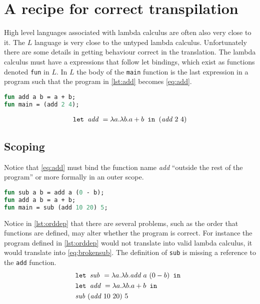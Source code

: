 \section{A recipe for correct transpilation}
High level languages associated with lambda calculus are often also very close to it.
The $L$ language is very close to the untyped lambda calculus.
Unfortunately there are some details in getting behaviour correct in the translation.
The lambda calculus must have a expressions that follow let bindings, which exist as functions denoted \texttt{fun} in $L$.
In $L$ the body of the \texttt{main} function is the last expression in a program such that the program in \autoref{lst:add} becomes \autoref{eq:add}.
\begin{lstlisting}[language=ML,caption={Add function in L},label={lst:add}]
fun add a b = a + b;
fun main = (add 2 4);
\end{lstlisting}
\begin{align}
  \texttt{let } \textit{add } = \lambda a.\lambda b.a + b \texttt{ in } (\textit{add } 2 \,\, 4)\label{eq:add}
\end{align}

\subsection{Scoping}\label{scoping}
Notice that \autoref{eq:add} must bind the function name \textit{add} ``outside the rest of the program'' or more formally in an outer scope.
\begin{lstlisting}[language=ML,caption={An order dependent program},label={lst:orddep}]
fun sub a b = add a (0 - b);
fun add a b = a + b;
fun main = sub (add 10 20) 5;
\end{lstlisting}
Notice in \autoref{lst:orddep} that there are several problems, such as the order that functions are defined, may alter whether the program is correct.
For instance the program defined in \autoref{lst:orddep} would not translate into valid lambda calculus, it would translate into \autoref{eq:brokensub}.
The definition of \texttt{sub} is missing a reference to the \texttt{add} function.
\begin{align}
  &\texttt{let } \textit{sub } = \lambda a.\lambda b.\textit{add } a \,\,(0 - b) \texttt{ in } \label{eq:brokensub}\\&\texttt{let } \textit{add } = \lambda a.\lambda b.a+b \texttt{ in } \tag*{}\\&\textit{sub } (\textit{add } 10 \,\, 20) \,\, 5\tag*{}
\end{align}

